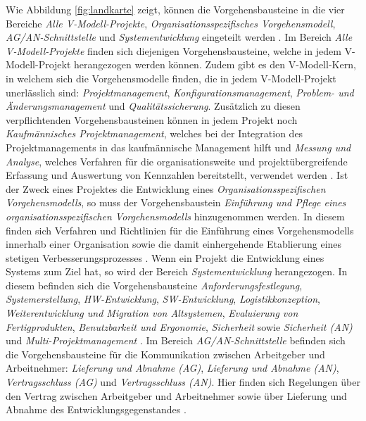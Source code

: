  Wie Abbildung \ref{fig:landkarte} zeigt, können die Vorgehensbausteine in die vier Bereiche \textit{Alle V-Modell-Projekte}, \textit{Organisationsspezifisches Vorgehensmodell}, \textit{AG/AN-Schnittstelle} und \textit{Systementwicklung} eingeteilt werden \cite{2004vmodell}.\newline
 Im Bereich \textit{Alle V-Modell-Projekte} finden sich diejenigen Vorgehensbausteine, welche in jedem V-Modell-Projekt herangezogen werden können. Zudem gibt es den V-Modell-Kern, in welchem sich die Vorgehensmodelle finden, die in jedem V-Modell-Projekt unerlässlich sind: \textit{Projektmanagement}, \textit{Konfigurationsmanagement}, \textit{Problem- und Änderungsmanagement} und \textit{Qualitätssicherung}. Zusätzlich zu diesen verpflichtenden Vorgehensbausteinen können in jedem Projekt noch \textit{Kaufmännisches Projektmanagement}, welches bei der Integration des Projektmanagements in das kaufmännische Management hilft und \textit{Messung und Analyse}, welches Verfahren für die organisationsweite und projektübergreifende Erfassung und Auswertung von Kennzahlen bereitstellt, verwendet werden \cite{2004vmodell}.\newline
 Ist der Zweck eines Projektes die Entwicklung eines \textit{Organisationsspezifischen Vorgehensmodells}, so muss der Vorgehensbaustein \textit{Einführung und Pflege eines organisationsspezifischen Vorgehensmodells} hinzugenommen werden. In diesem finden sich Verfahren und Richtlinien für die Einführung eines Vorgehensmodells innerhalb einer Organisation sowie die damit einhergehende Etablierung eines stetigen Verbesserungsprozesses \cite{2004vmodell}.\newline
 Wenn ein Projekt die Entwicklung eines Systems zum Ziel hat, so wird der Bereich \textit{Systementwicklung} herangezogen. In diesem befinden sich die Vorgehensbausteine \textit{Anforderungsfestlegung}, \textit{Systemerstellung}, \textit{HW-Entwicklung}, \textit{SW-Entwicklung}, \textit{Logistikkonzeption}, \textit{Weiterentwicklung und Migration von Altsystemen}, \textit{Evaluierung von Fertigprodukten}, \textit{Benutzbarkeit und Ergonomie}, \textit{Sicherheit} sowie \textit{Sicherheit (AN)} und \textit{Multi-Projektmanagement} \cite{2004vmodell}. \newline
 Im Bereich \textit{AG/AN-Schnittstelle} befinden sich die Vorgehensbausteine für die Kommunikation zwischen Arbeitgeber und Arbeitnehmer: \textit{Lieferung und Abnahme (AG)}, \textit{Lieferung und Abnahme (AN)}, \textit{Vertragsschluss (AG)} und \textit{Vertragsschluss (AN)}. Hier finden sich Regelungen über den Vertrag zwischen Arbeitgeber und Arbeitnehmer sowie über Lieferung und Abnahme des Entwicklungsgegenstandes \cite{2004vmodell}. \newline
 
